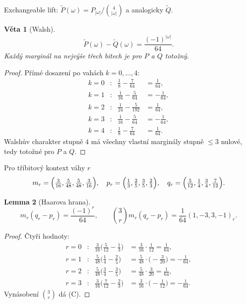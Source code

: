 \documentclass[11pt,a4paper]{article}
\newtheorem{theorem}{Věta}
\newtheorem{lemma}[theorem]{Lemma}
\theoremstyle{definition}
\theoremstyle{remark}
\theoremstyle{plain}
\begin{document}
Exchangeable lift: $\widetilde P(\omega)=P_{|\omega|}/\binom4{|\omega|}$
a analogicky $\widetilde Q$.

\begin{theorem}[Walsh]
\[
\widetilde P(\omega)-\widetilde Q(\omega)=\frac{(-1)^{|\omega|}}{64}.
\tag{A}
\]
Každý marginál na nejvýše třech bitech je pro $P$ a $Q$ totožný.
\end{theorem}

\begin{proof}
Přímé dosazení po vahách $k=0,\dots,4$:
\[
\begin{aligned}
k=0&\colon& \tfrac18-\tfrac7{64}&=\tfrac1{64},\\
k=1&\colon& \tfrac1{16}-\tfrac5{64}&=-\tfrac1{64},\\
k=2&\colon& \tfrac1{24}-\tfrac5{192}&=\tfrac1{64},\\
k=3&\colon& \tfrac1{16}-\tfrac5{64}&=-\tfrac1{64},\\
k=4&\colon& \tfrac18-\tfrac7{64}&=\tfrac1{64}.
\end{aligned}
\]
Walshův charakter stupně $4$ má všechny vlastní marginály stupně $\le 3$
nulové, tedy totožné pro $P$ a $Q$.
\end{proof}

Pro tříbitový kontext váhy $r$
\[
m_r=\Bigl(\tfrac3{16},\tfrac5{48},\tfrac5{48},\tfrac3{16}\Bigr),\quad
p_r=\Bigl(\tfrac13,\tfrac25,\tfrac35,\tfrac23\Bigr),\quad
q_r=\Bigl(\tfrac5{12},\tfrac14,\tfrac34,\tfrac7{12}\Bigr).
\]

\begin{lemma}[Haarova hrana]
\[
m_r(q_r-p_r)=\frac{(-1)^r}{64},
\tag{B}
\qquad
\binom3r m_r(q_r-p_r)=\frac1{64}(1,-3,3,-1)_r.
\tag{C}
\]
\end{lemma}

\begin{proof}
Čtyři hodnoty:
\[
\begin{aligned}
r=0&\colon& \tfrac3{16}\bigl(\tfrac5{12}-\tfrac13\bigr)
&=\tfrac3{16}\cdot\tfrac1{12}=\tfrac1{64},\\
r=1&\colon& \tfrac5{48}\bigl(\tfrac14-\tfrac25\bigr)
&=\tfrac5{48}\cdot\bigl(-\tfrac3{20}\bigr)=-\tfrac1{64},\\
r=2&\colon& \tfrac5{48}\bigl(\tfrac34-\tfrac35\bigr)
&=\tfrac5{48}\cdot\tfrac3{20}=\tfrac1{64},\\
r=3&\colon& \tfrac3{16}\bigl(\tfrac7{12}-\tfrac23\bigr)
&=\tfrac3{16}\cdot\bigl(-\tfrac1{12}\bigr)=-\tfrac1{64}.
\end{aligned}
\]
Vynásobení $\binom3r$ dá (C).
\end{proof}
\end{document}
